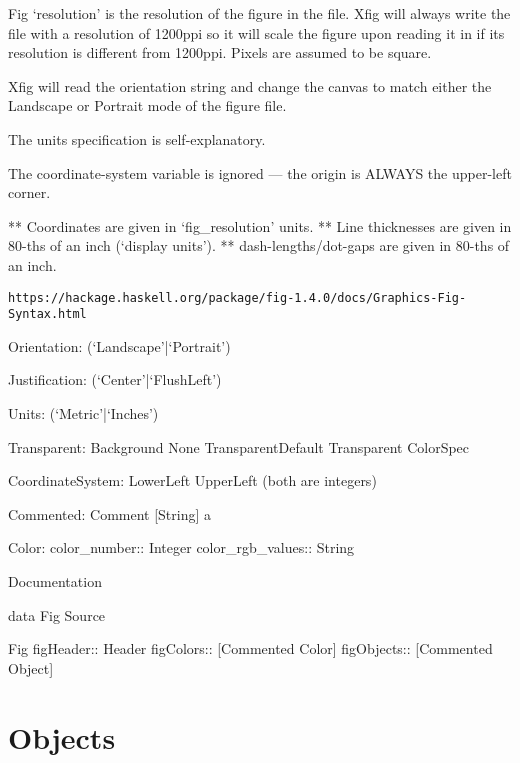 \documentclass[10pt, a4paper]{article}
\begin{document}
 Fig `resolution' is the resolution of the figure in the file.
    Xfig will always write the file with a resolution of 1200ppi so it
    will scale the figure upon reading it in if its resolution is different
    from 1200ppi.  Pixels are assumed to be square.

    Xfig will read the orientation string and change the canvas to match
    either the Landscape or Portrait mode of the figure file.

    The units specification is self-explanatory.

    The coordinate-system variable is ignored --- the origin is ALWAYS the
    upper-left corner.

    ** Coordinates are given in `fig\_resolution' units.
    ** Line thicknesses are given in 80-ths of an inch (`display units').
    ** dash-lengths/dot-gaps are given in 80-ths of an inch.


\begin{Verbatim}[fontsize=\scriptsize]
https://hackage.haskell.org/package/fig-1.4.0/docs/Graphics-Fig-Syntax.html
\end{Verbatim}





Orientation: (`Landscape'|`Portrait')

Justification: (`Center'|`FlushLeft')

Units: (`Metric'|`Inches')





Transparent:
Background	 
None	 
TransparentDefault	 
Transparent ColorSpec	 


CoordinateSystem:
LowerLeft	 
UpperLeft	 
(both are integers)

Commented:
Comment [String] a	 


Color:
color\_number:: Integer
color\_rgb\_values:: String


Documentation

data Fig
Source

Fig	 
figHeader:: Header
figColors:: [Commented Color]
figObjects:: [Commented Object]


\section{Objects}\label{sec:obj}
\end{document}
